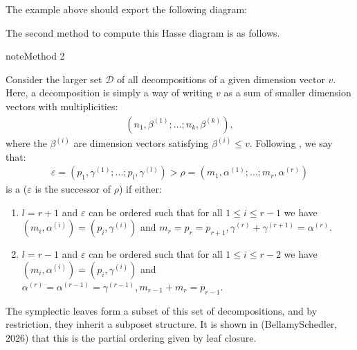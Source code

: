 \documentclass[letterpaper,10pt,english]{sphinxmanual}
\begin{document}
\sphinxAtStartPar
The example above should export the following diagram:

\noindent{}

\sphinxAtStartPar
The second method to compute this Hasse diagram is as follows.

\begin{sphinxadmonition}{note}{Method 2}

\sphinxAtStartPar
Consider the larger set \(\mathcal{D}\) of all decompositions of a given dimension vector \(v\). Here, a decomposition is simply a way of writing \(v\) as a sum of smaller dimension vectors with multiplicities:
\begin{equation*}
\begin{split}\left(n_1,\beta^{(1)};\dots;n_k,\beta^{(k)}\right),\end{split}
\end{equation*}
\sphinxAtStartPar
where the \(\beta^{(i)}\) are dimension vectors satisfying \(\beta^{(i)}\leq v\). Following , we say that:
\begin{equation*}
\begin{split}\varepsilon=(p_1,\gamma^{(1)};\dots;p_l,\gamma^{(l)})>\rho=(m_1,\alpha^{(1)};\dots;m_r,\alpha^{(r)})\end{split}
\end{equation*}
\sphinxAtStartPar
is a  (\(\varepsilon\) is the successor of \(\rho\)) if either:
\begin{enumerate}
%
\item {} 
\sphinxAtStartPar
\(l=r+1\) and \(\varepsilon\) can be ordered such that for all \(1\leq i\leq r-1\) we have \((m_i,\alpha^{(i)})=(p_i,\gamma^{(i)})\) and \(m_r=p_r=p_{r+1},\gamma^{(r)}+\gamma^{(r+1)}=\alpha^{(r)}\).

\item {} 
\sphinxAtStartPar
\(l=r-1\) and \(\varepsilon\) can be ordered such that for all \(1\leq i\leq r-2\) we have \((m_i,\alpha^{(i)})=(p_i,\gamma^{(i)})\) and \(\alpha^{(r)}=\alpha^{(r-1)}=\gamma^{(r-1)},m_{r-1}+m_r=p_{r-1}\).

\end{enumerate}
\end{sphinxadmonition}

\sphinxAtStartPar
The symplectic leaves form a subset of this set of decompositions, and by restriction, they inherit a sub\sphinxhyphen{}poset structure. It is shown in (Bellamy\sphinxhyphen{}Schedler, 2026) that this is the partial ordering given by leaf closure.
\end{document}
